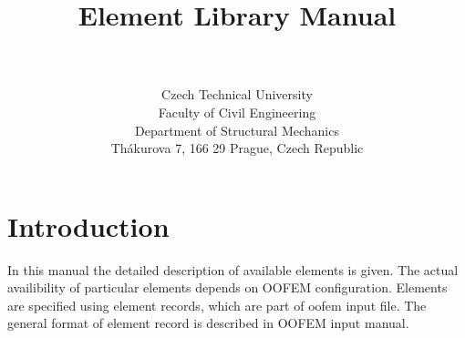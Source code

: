 \documentclass[a4paper]{article}
\begin{document}
\title{
\ifpdf
{}
\else
{}
\fi
Element Library Manual}
\author{\bp \\ \\
Czech Technical University\\
Faculty of Civil Engineering\\
Department of Structural Mechanics\\
Th\'akurova 7, 166 29 Prague, Czech Republic
}
\maketitle
\newpage
\tableofcontents
\newpage
\listoffigures

\section{Introduction}
In this manual the detailed description of available elements 
is given. The actual availibility of particular elements depends on
OOFEM configuration. Elements are specified using element records,
which are part of oofem input file. The general format of element
record is described in OOFEM input manual. 
\end{document}
